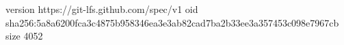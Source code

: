 version https://git-lfs.github.com/spec/v1
oid sha256:5a8a6200fca3c4875b958346ea3e3ab82cad7ba2b33ee3a357453c098e7967cb
size 4052
